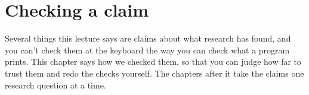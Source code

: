 %

\chapter{Checking a claim}
\label{app:ai-method}

Several things this lecture says are claims about what research has found, and
you can't check them at the keyboard the way you can check what a program
prints.
This chapter says how we checked them, so that you can judge how far to trust
them and redo the checks yourself.
The chapters after it take the claims one research question at a time.

